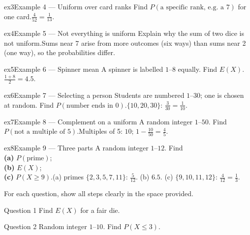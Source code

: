 \documentclass[11pt]{article}
\begin{document}
\begin{example}{ex3}{Example 4 --- Uniform over card ranks}
Find $P(\text{a specific rank, e.g. a 7})$ for one card.\soln $\tfrac{4}{52}=\tfrac{1}{13}$.
\end{example}

\begin{example}{ex4}{Example 5 --- Not everything is uniform}
Explain why the sum of two dice is not uniform.\soln Sums near 7 arise from more outcomes (six ways) than sums near 2 (one way), so the probabilities differ.
\end{example}

\begin{example}{ex5}{Example 6 --- Spinner mean}
A spinner is labelled $1$--$8$ equally. Find $E(X)$.\soln $\tfrac{1+8}{2}=4.5$.
\end{example}

\begin{example}{ex6}{Example 7 --- Selecting a person}
Students are numbered $1$--$30$; one is chosen at random. Find $P(\text{number ends in }0)$.\soln $\{10,20,30\}$: $\tfrac{3}{30}=\tfrac{1}{10}$.
\end{example}

\begin{example}{ex7}{Example 8 --- Complement on a uniform}
A random integer $1$--$50$. Find $P(\text{not a multiple of }5)$.\soln Multiples of 5: $10$; $1-\tfrac{10}{50}=\tfrac45$.
\end{example}

\begin{example}{ex8}{Example 9 --- Three parts}
A random integer $1$--$12$. Find \\ \textbf{(a)} $P(\text{prime})$; \\ \textbf{(b)} $E(X)$; \\ \textbf{(c)} $P(X\ge9)$.\soln (a) primes $\{2,3,5,7,11\}$: $\tfrac{5}{12}$. (b) $6.5$. (c) $\{9,10,11,12\}$: $\tfrac{4}{12}=\tfrac13$.
\end{example}

\clearpage
{}
For each question, show all steps clearly in the space provided.

\begin{qbox}{Question 1}
Find $E(X)$ for a fair die.\workspace{2.4cm}
\end{qbox}

\begin{qbox}{Question 2}
Random integer $1$--$10$. Find $P(X\le3)$.\workspace{2.4cm}
\end{qbox}
\end{document}
